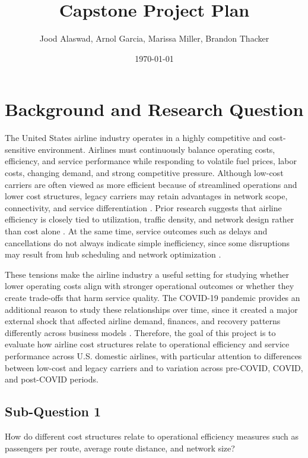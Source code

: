 \documentclass[11pt, letterpaper]{article}
\title{Capstone Project Plan}
\author{Jood Alaswad, Arnol Garcia, Marissa Miller, Brandon Thacker}
\date{\today}
\begin{document}
\maketitle

\section{Background and Research Question}

The United States airline industry operates in a highly competitive and cost-sensitive environment. Airlines must continuously balance operating costs, efficiency, and service performance while responding to volatile fuel prices, labor costs, changing demand, and strong competitive pressure. Although low-cost carriers are often viewed as more efficient because of streamlined operations and lower cost structures, legacy carriers may retain advantages in network scope, connectivity, and service differentiation \cite{barbot2008, fontanet2022}. Prior research suggests that airline efficiency is closely tied to utilization, traffic density, and network design rather than cost alone \cite{banker1993, caves1984, zuidberg2014}. At the same time, service outcomes such as delays and cancellations do not always indicate simple inefficiency, since some disruptions may result from hub scheduling and network optimization \cite{mayer2002, lee2023}. 

These tensions make the airline industry a useful setting for studying whether lower operating costs align with stronger operational outcomes or whether they create trade-offs that harm service quality. The COVID-19 pandemic provides an additional reason to study these relationships over time, since it created a major external shock that affected airline demand, finances, and recovery patterns differently across business models \cite{fontanet2022, gudmundsson2021, nguyen2022}. Therefore, the goal of this project is to evaluate how airline cost structures relate to operational efficiency and service performance across U.S. domestic airlines, with particular attention to differences between low-cost and legacy carriers and to variation across pre-COVID, COVID, and post-COVID periods.

\subsection{Sub-Question 1}
How do different cost structures relate to operational efficiency measures such as passengers per route, average route distance, and network size?
\end{document}

